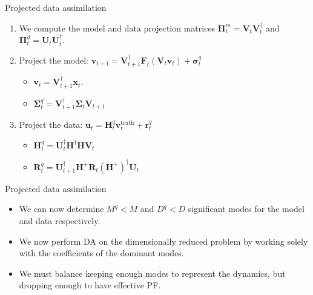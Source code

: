\documentclass[aspectratio=169]{beamer}
\newcommand{\state}{\boldsymbol{x}}
\newcommand{\modelcovariance}{\boldsymbol{\Sigma}}
\newcommand{\observationcovariance}{\boldsymbol{R}}
\newcommand{\modelf}{\boldsymbol{F}}
\newcommand{\projectedstate}{\boldsymbol{v}}
\begin{document}

\begin{frame}{Projected data assimilation}
\vfill
    \begin{enumerate}
    \pause
        \item We compute the model and data projection matrices $\boldsymbol{\Pi}_t^m = \boldsymbol{V}_t \boldsymbol{V}_t^\dagger$ and $\boldsymbol{\Pi}_t^d = \boldsymbol{U}_t \boldsymbol{U}_t^\dagger$.
    \pause
        \item Project the model: $\projectedstate_{t+1} = \boldsymbol{V}_{t+1}^\dagger \modelf_t(\boldsymbol{V}_t \projectedstate_t) + \boldsymbol{\sigma}_t^q$
        \begin{itemize}
            \item $\projectedstate_t=\boldsymbol{V}_{t+1}^\dagger \state_t$.
            \item $\modelcovariance^q_t = \boldsymbol{V}_{t+1}^\dagger \modelcovariance_t \boldsymbol{V}_{t+1}$
        \end{itemize}
    \pause
        \item Project the data: $\boldsymbol{u}_t=\boldsymbol{H}^q_t \projectedstate_t^{\textrm{truth}} + \boldsymbol{r}^q_t$
        \begin{itemize}
            \item $\boldsymbol{H}^q_t = \boldsymbol{U}_t^\dagger \boldsymbol{H}^\dagger \boldsymbol{H} \boldsymbol{V}_t$
            \item $\observationcovariance^q_t = \boldsymbol{U}_{t+1}^\dagger \boldsymbol{H}^+ \observationcovariance_t (\boldsymbol{H}^+)^\dagger \boldsymbol{U}_{t}$
        \end{itemize}
\end{enumerate}
\vfill
\end{frame}


\begin{frame}{Projected data assimilation}
\vfill
    \begin{itemize}
    \pause
        \item We can now determine $M^q<M$ and $D^q<D$ significant modes for the model and data respectively.
    \pause
        \item We now perform DA on the dimensionally reduced problem by working solely with the coefficients of the dominant modes.
    \pause
        \item We must balance keeping enough modes to represent the dynamics, but dropping enough to have effective PF.
    \end{itemize}
\vfill
\end{frame}
\end{document}
